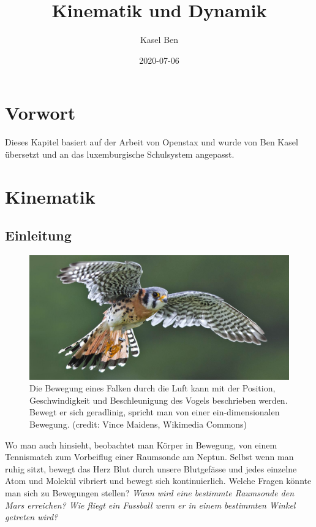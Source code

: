 \documentclass[
]{book}
\title{Kinematik und Dynamik}
\author{Kasel Ben}
\date{2020-07-06}
\begin{document}
\maketitle

{
\setcounter{tocdepth}{1}
\tableofcontents
}
\hypertarget{vorwort}{%
\chapter{Vorwort}\label{vorwort}}

Dieses Kapitel basiert auf der Arbeit von Openstax \citet{wolfe_college_2015} und wurde von Ben Kasel übersetzt und an das luxemburgische Schulsystem angepasst.

\hypertarget{kinematik}{%
\chapter{Kinematik}\label{kinematik}}

\hypertarget{einleitung}{%
\section{Einleitung}\label{einleitung}}

\begin{figure}
\hypertarget{import-auto-id2758213}{%
\centering
\includegraphics{images/Figure_02_00_01_D.jpg}
\caption{Die Bewegung eines Falken durch die Luft kann mit der Position, Geschwindigkeit und Beschleunigung des Vogels beschrieben werden. Bewegt er sich geradlinig, spricht man von einer ein-dimensionalen Bewegung. (credit: Vince Maidens, Wikimedia
Commons)}\label{import-auto-id2758213}
}
\end{figure}

Wo man auch hinsieht, beobachtet man Körper in Bewegung, von einem Tennismatch zum Vorbeiflug einer Raumsonde am Neptun. Selbst wenn man ruhig sitzt, bewegt das Herz Blut durch unsere Blutgefässe und jedes einzelne Atom und Molekül vibriert und bewegt sich kontinuierlich. Welche Fragen könnte man sich zu Bewegungen stellen? \emph{Wann wird eine bestimmte Raumsonde den Mars erreichen? Wie fliegt ein Fussball wenn er in einem bestimmten Winkel getreten wird?}
\end{document}
